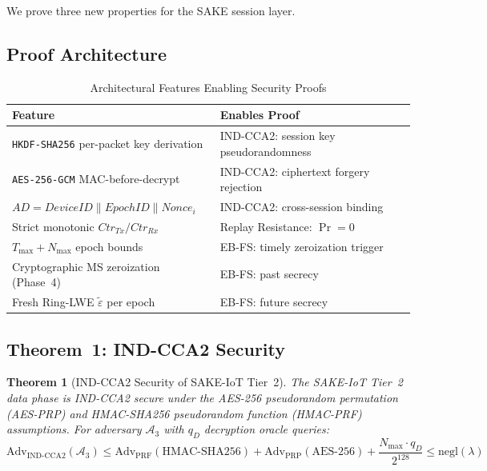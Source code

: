 \documentclass[conference]{IEEEtran}
\newtheorem{theorem}{Theorem}
\newcommand{\GCM}{\texttt{AES-256-GCM}}
\newcommand{\HKDF}{\texttt{HKDF-SHA256}}
\newcommand{\Nmax}{N_{\max}}
\newcommand{\Tmax}{T_{\max}}
\begin{document}
We prove three new properties for the SAKE session layer.

\subsection{Proof Architecture}

\begin{table}[!t]
\centering
\caption{Architectural Features Enabling Security Proofs}
\label{tab:proofarch}
\renewcommand{\arraystretch}{1.2}
\begin{tabular}{ll}
\toprule
\textbf{Feature} & \textbf{Enables Proof} \\
\midrule
\HKDF{} per-packet key derivation & IND-CCA2: session key pseudorandomness \\
\GCM{} MAC-before-decrypt & IND-CCA2: ciphertext forgery rejection \\
$AD = \mathit{DeviceID} \| \mathit{EpochID} \| \mathit{Nonce}_i$ & IND-CCA2: cross-session binding \\
Strict monotonic $\mathit{Ctr}_{Tx}/\mathit{Ctr}_{Rx}$ & Replay Resistance: $\Pr = 0$ \\
$\Tmax + \Nmax$ epoch bounds & EB-FS: timely zeroization trigger \\
Cryptographic MS zeroization (Phase~4) & EB-FS: past secrecy \\
Fresh Ring-LWE $\tilde{\varepsilon}$ per epoch & EB-FS: future secrecy \\
\bottomrule
\end{tabular}
\end{table}

\subsection{Theorem~1: IND-CCA2 Security}

\begin{theorem}[IND-CCA2 Security of SAKE-IoT Tier~2]
\label{thm:indcca2}
The SAKE-IoT Tier~2 data phase is IND-CCA2 secure under the AES-256
pseudorandom permutation (AES-PRP) and HMAC-SHA256 pseudorandom function
(HMAC-PRF) assumptions. For adversary $\mathcal{A}_3$ with $q_D$ decryption
oracle queries:
\begin{equation}
\mathrm{Adv}_{\mathrm{IND\text{-}CCA2}}(\mathcal{A}_3) \leq
  \mathrm{Adv}_{\mathrm{PRF}}(\mathrm{HMAC\text{-}SHA256}) +
  \mathrm{Adv}_{\mathrm{PRP}}(\mathrm{AES\text{-}256}) +
  \frac{\Nmax \cdot q_D}{2^{128}} \leq \mathrm{negl}(\lambda)
\end{equation}
\end{theorem}
\end{document}
